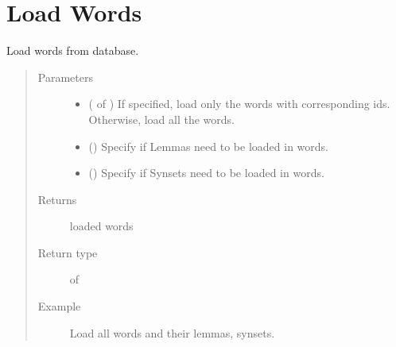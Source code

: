 \documentclass[letterpaper,10pt,english]{sphinxmanual}
\begin{document}
\section{Load Words}
\label{\detokenize{load:module-loacore.load.word_load}}\label{\detokenize{load:load-words}}

\begin{fulllineitems}
\label{\detokenize{load:loacore.load.word_load.load_words}}
Load words from database.
\begin{quote}\begin{description}
\item[{Parameters}] \leavevmode\begin{itemize}
\item {} 
 ( of ) \textendash{} If specified, load only the words with corresponding ids. Otherwise, load all the words.

\item {} 
 () \textendash{} Specify if Lemmas need to be loaded in words.

\item {} 
 () \textendash{} Specify if Synsets need to be loaded in words.

\end{itemize}

\item[{Returns}] \leavevmode
loaded words

\item[{Return type}] \leavevmode
{} of {\hyperref[\detokenize{classes:loacore.classes.classes.Word}]{}}

\item[{Example}] \leavevmode
Load all words and their lemmas, synsets.


\end{description}
\end{quote}
\end{fulllineitems}
\end{document}
